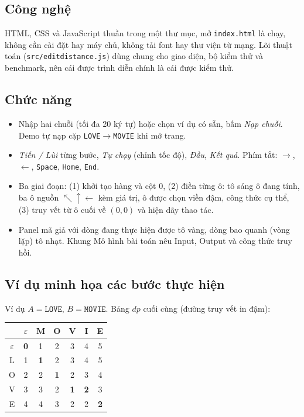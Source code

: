\documentclass[12pt,a4paper]{article}
\newcommand{\code}[1]{\texttt{#1}}
\begin{document}
\subsection{Công nghệ}
HTML, CSS và JavaScript thuần trong một thư mục, mở \code{index.html} là chạy, không cần cài đặt hay máy chủ, không tải font hay thư viện từ mạng. Lõi thuật toán (\code{src/editdistance.js}) dùng chung cho giao diện, bộ kiểm thử và benchmark, nên cái được trình diễn chính là cái được kiểm thử.

\subsection{Chức năng}
\begin{itemize}[nosep]
  \item Nhập hai chuỗi (tối đa 20 ký tự) hoặc chọn ví dụ có sẵn, bấm \emph{Nạp chuỗi}. Demo tự nạp cặp \code{LOVE}$\to$\code{MOVIE} khi mở trang.
  \item \emph{Tiến / Lùi} từng bước, \emph{Tự chạy} (chỉnh tốc độ), \emph{Đầu}, \emph{Kết quả}. Phím tắt: $\rightarrow$, $\leftarrow$, \code{Space}, \code{Home}, \code{End}.
  \item Ba giai đoạn: (1) khởi tạo hàng và cột 0, (2) điền từng ô: tô sáng ô đang tính, ba ô nguồn $\nwarrow\uparrow\leftarrow$ kèm giá trị, ô được chọn viền đậm, công thức cụ thể, (3) truy vết từ ô cuối về $(0,0)$ và hiện dãy thao tác.
  \item Panel mã giả với dòng đang thực hiện được tô vàng, dòng bao quanh (vòng lặp) tô nhạt. Khung Mô hình bài toán nêu Input, Output và công thức truy hồi.
\end{itemize}

\subsection{Ví dụ minh họa các bước thực hiện}
Ví dụ $A=\code{LOVE}$, $B=\code{MOVIE}$. Bảng $dp$ cuối cùng (đường truy vết in đậm):
\begin{center}
\begin{tabular}{c|cccccc}
 & $\varepsilon$ & M & O & V & I & E\\
\hline
$\varepsilon$ & \textbf{0} & 1 & 2 & 3 & 4 & 5\\
L & 1 & \textbf{1} & 2 & 3 & 4 & 5\\
O & 2 & 2 & \textbf{1} & 2 & 3 & 4\\
V & 3 & 3 & 2 & \textbf{1} & \textbf{2} & 3\\
E & 4 & 4 & 3 & 2 & 2 & \textbf{2}\\
\end{tabular}
\end{center}
\end{document}
